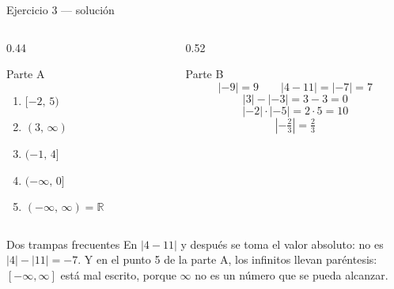 \documentclass[aspectratio=169,10pt]{beamer}
\begin{document}
\begin{frame}{Ejercicio 3 — solución}
  \scriptsize
  \begin{columns}[T,onlytextwidth]
    \begin{column}{0.44\textwidth}
      \begin{block}{Parte A}
        \tiny
        \begin{enumerate}\setlength{\itemsep}{-0.02cm}
          \item $[-2,\,5)$
          \item $(3,\,\infty)$
          \item $(-1,\,4]$
          \item $(-\infty,\,0]$
          \item $(-\infty,\,\infty) = \mathbb{R}$
        \end{enumerate}
      \end{block}
    \end{column}
    \begin{column}{0.52\textwidth}
      \begin{block}{Parte B}
        \tiny
        \[ |{-9}| = 9 \qquad |4-11| = |{-7}| = 7 \]
        \[ |3| - |{-3}| = 3 - 3 = 0 \]
        \[ |{-2}|\cdot|{-5}| = 2 \cdot 5 = 10 \]
        \[ \left|-\tfrac{2}{3}\right| = \tfrac{2}{3} \]
      \end{block}
    \end{column}
  \end{columns}

  \vspace{0.08cm}
  \begin{alertblock}{Dos trampas frecuentes}
    \tiny
    En $|4-11|$  y después se toma el valor
    absoluto: no es $|4| - |11| = -7$. \quad
    Y en el punto 5 de la parte A, los infinitos  llevan
    paréntesis: $[-\infty, \infty]$ está mal escrito, porque $\infty$ no es un
    número que se pueda alcanzar.
  \end{alertblock}
\end{frame}
\end{document}
